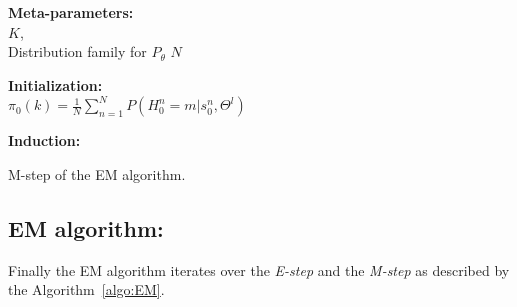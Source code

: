 \documentclass[a4paper,11pt]{report}
\begin{document}
			\begin{center}
				\begin{algorithm}
					\textbf{Meta-parameters:}\\
						$K$,\\
						Distribution family for $P_{\theta}$ 
						$N$ 
							
					\textbf{Initialization:}\\
						$\pi_{0}(k) = \frac{1}{N} \sum_{n=1}^{N} P(H_{0}^{n}=m|s_{0}^{n},\Theta^{l})$
							
					\textbf{Induction:}\\
					\caption{M-step of the EM algorithm.}
					\label{algo:Mstep}
				\end{algorithm}        
			\end{center}
			
		\subsection{EM algorithm:}
			\label{subsec:SCHMT/Learning/EM}
			
			Finally the EM algorithm iterates over the \textit{E-step} and the \textit{M-step} as described by the Algorithm~\ref{algo:EM}.
			
\end{document}
